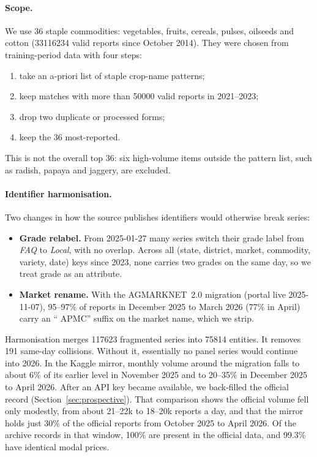 \paragraph{Scope.}
We use 36 staple commodities: vegetables, fruits, cereals, pulses, oilseeds and cotton (\num{33116234} valid reports since October 2014).
They were chosen from training-period data with four steps:
\begin{enumerate}
  \item take an a-priori list of staple crop-name patterns;
  \item keep matches with more than \num{50000} valid reports in 2021--2023;
  \item drop two duplicate or processed forms;
  \item keep the 36 most-reported.
\end{enumerate}
This is not the overall top 36: six high-volume items outside the pattern list, such as radish, papaya and jaggery, are excluded.

\paragraph{Identifier harmonisation.}
Two changes in how the source publishes identifiers would otherwise break series:
\begin{itemize}
  \item \textbf{Grade relabel.} From 2025-01-27 many series switch their grade label from \emph{FAQ} to \emph{Local}, with no overlap.
    Across all (state, district, market, commodity, variety, date) keys since 2023, none carries two grades on the same day, so we treat grade as an attribute.
  \item \textbf{Market rename.} With the AGMARKNET~2.0 migration (portal live 2025-11-07), 95--97\% of reports in December 2025 to March 2026 (77\% in April) carry an `` APMC'' suffix on the market name, which we strip.
\end{itemize}
Harmonisation merges \num{117623} fragmented series into \num{75814} entities.
It removes \num{191} same-day collisions.
Without it, essentially no panel series would continue into 2026.
In the Kaggle mirror, monthly volume around the migration falls to about 6\% of its earlier level in November 2025 and to 20--35\% in December 2025 to April 2026.
After an API key became available, we back-filled the official record (Section~\ref{sec:prospective}). That comparison shows the official volume fell only modestly, from about 21--22k to 18--20k reports a day, and that the mirror holds just 30\% of the official reports from October 2025 to April 2026.
Of the archive records in that window, 100\% are present in the official data, and 99.3\% have identical modal prices.

